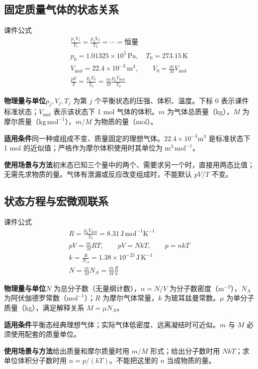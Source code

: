 \documentclass[UTF8,fontset=none,zihao=-4,a4paper]{ctexart}
\newcommand{\unit}[1]{\,\mathrm{#1}}
\newcommand{\explain}[3]{\par\noindent\textbf{物理量与单位}\quad #1\par
\noindent\textbf{适用条件}\quad #2\par
\noindent\textbf{使用场景与方法}\quad #3\par}
\begin{document}
\par\noindent\begin{minipage}{\linewidth}
\subsection{固定质量气体的状态关系}
\begin{infobox}[breakable=false]{课件公式}
\begin{gather*}\frac{p_1V_1}{T_1}=\frac{p_2V_2}{T_2}=\cdots=\text{恒量}\\p_0=1.01325\times10^5\unit{Pa},\quad T_0=273.15\unit K\\V_{\mathrm{mol}}=22.4\times10^{-3}\unit{m^3},\qquad V_0=\frac mM V_{\mathrm{mol}}\\\frac{pV}{T}=\frac{p_0V_0}{T_0}=\frac mM\frac{p_0V_{\mathrm{mol}}}{T_0}\end{gather*}
\end{infobox}
\end{minipage}\par
\explain{$p_j,V_j,T_j$ 为第 $j$ 个平衡状态的压强、体积、温度。下标 0 表示课件标准状态；$V_{\mathrm{mol}}$ 表示该状态下 1 mol 气体的体积。$m$ 为气体总质量（kg），$M$ 为摩尔质量（$\mathrm{kg\,mol^{-1}}$），$m/M$ 为物质的量（mol）。}{同一种或组成不变、质量固定的理想气体。$22.4\times10^{-3}\mathrm{m^3}$ 是标准状态下 1 mol 的近似值；严格作为摩尔体积使用时其单位为 $\mathrm{m^3\,mol^{-1}}$。}{初末态已知三个量中的两个、需要求另一个时，直接用两态比值；无需先求物质的量。气体有泄漏或反应改变组成时，不能默认 $pV/T$ 不变。}


\par\noindent\begin{minipage}{\linewidth}
\subsection{状态方程与宏微观联系}
\begin{infobox}[breakable=false]{课件公式}
\begin{gather*}R=\frac{p_0V_{\mathrm{mol}}}{T_0}=8.31\unit{J\,mol^{-1}K^{-1}}\\pV=\frac mM RT,\qquad pV=NkT,\qquad p=nkT\\k=\frac R{N_A}=1.38\times10^{-23}\unit{J\,K^{-1}}\\N=\frac mM N_A=\frac mM\frac Rk\end{gather*}
\end{infobox}
\end{minipage}\par
\explain{$N$ 为总分子数（无量纲计数），$n=N/V$ 为分子数密度（$\mathrm m^{-3}$），$N_A$ 为阿伏伽德罗常数（$\mathrm{mol^{-1}}$）；$R$ 为摩尔气体常量，$k$ 为玻耳兹曼常数。$\mu$ 为单分子质量（kg），满足解释关系 $M=\mu N_A$。}{平衡态经典理想气体；实际气体低密度、远离凝结时可近似。$m$ 与 $M$ 必须使用配套的质量单位。}{给出质量和摩尔质量时用 $m/M$ 形式；给出分子数时用 $NkT$；求单位体积分子数时用 $n=p/(kT)$。不能把这里的 $n$ 当成物质的量。}
\end{document}
